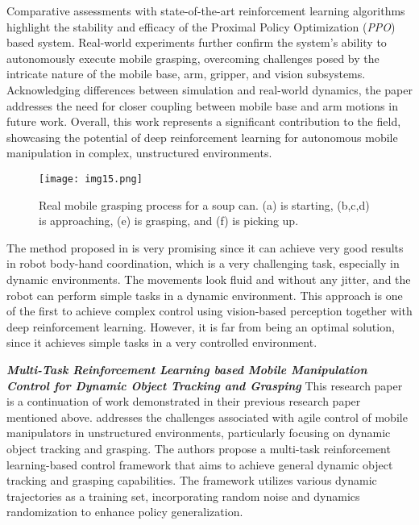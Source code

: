 Comparative assessments with state-of-the-art reinforcement learning algorithms highlight
the stability and efficacy of the Proximal Policy Optimization (\textit{PPO}) based system.
Real-world experiments further confirm the system's ability to autonomously execute mobile grasping,
overcoming challenges posed by the intricate nature of the mobile base, arm, gripper, and vision subsystems.
Acknowledging differences between simulation and real-world dynamics, the paper addresses
the need for closer coupling between mobile base and arm motions in future work. Overall,
this work represents a significant contribution to the field, showcasing the potential of
deep reinforcement learning for autonomous mobile manipulation in complex, unstructured environments.

\begin{figure}[ht]
	\centering
	\texttt{[image: img15.png]}
	\captionsetup{width=1\linewidth}
	\caption{Real mobile grasping process for a soup can.
		(a) is starting, (b,c,d) is approaching, (e) is grasping, and (f) is picking up.
		\cite{wang2020drlmanipulation}}
	\label{fig:img15}
\end{figure}

The method proposed in \cite{wang2020drlmanipulation} is very promising since it can
achieve very good results in robot body-hand coordination, which is a very challenging task,
especially in dynamic environments. The movements look fluid and without any jitter,
and the robot can perform simple tasks in a dynamic environment. This approach is one of the first
to achieve complex control using vision-based perception together with deep reinforcement
learning. However, it is far from being an optimal solution, since it achieves simple
tasks in a very controlled environment.

\textbf{\textit{Multi-Task Reinforcement Learning based Mobile Manipulation
		Control for Dynamic Object Tracking and Grasping}} \quad
This research paper \cite{wang2022multitask} is a continuation of work demonstrated in
their previous research paper \cite{wang2020drlmanipulation} mentioned above.
\cite{wang2022multitask} addresses the challenges associated with
agile control of mobile manipulators in unstructured environments, particularly focusing
on dynamic object tracking and grasping. The authors propose a multi-task reinforcement
learning-based control framework that aims to achieve general dynamic object tracking and
grasping capabilities. The framework utilizes various dynamic trajectories as a training set,
incorporating random noise and dynamics randomization to enhance policy generalization.

